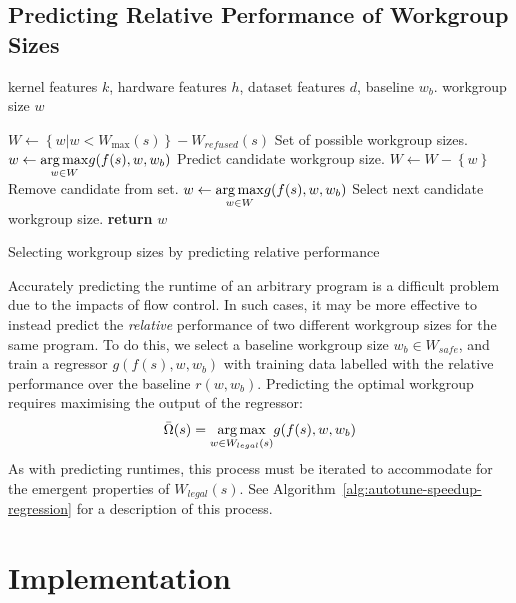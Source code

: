 \subsection{Predicting Relative Performance of Workgroup Sizes}\label{subsec:omnitune-ml-speedup}

\begin{algorithm}
\begin{algorithmic}[1]
\Require kernel features $k$, hardware features $h$, dataset features
$d$, baseline $w_b$.
\Ensure workgroup size $w$

\State $W \leftarrow \left\{ w | w < W_{\max}(s) \right\} - W_{refused}(s)$
\Comment Set of possible workgroup sizes.
\State $w \leftarrow \underset{w \in W}{\operatorname*{arg\,max}} g(f(s), w,w_b)$
\Comment Predict candidate workgroup size.
  \State $W \leftarrow W - \left\{ w \right\}$
  \Comment Remove candidate from set.
  \State $w \leftarrow \underset{w \in W}{\operatorname*{arg\,max}} g(f(s), w,w_b)$
  \Comment Select next candidate workgroup size.
\EndWhile
\State \textbf{return} $w$
\end{algorithmic}
\caption{Selecting workgroup sizes by predicting relative performance}
\label{alg:autotune-speedup-regression}
\end{algorithm}

Accurately predicting the runtime of an arbitrary program is a
difficult problem due to the impacts of flow control. In such cases,
it may be more effective to instead predict the \emph{relative}
performance of two different workgroup sizes for the same program. To
do this, we select a baseline workgroup size $w_b \in W_{safe}$, and
train a regressor $g(f(s),w,w_b)$ with training data labelled with the
relative performance over the baseline $r(w, w_b)$. Predicting the
optimal workgroup requires maximising the output of the regressor:
%
\begin{equation}
  \bar{\Omega}(s) = \underset{w \in W_{legal}(s)}{\operatorname*{arg\,max}} g(f(s),w,w_b)
\end{equation}
%
As with predicting runtimes, this process must be iterated to
accommodate for the emergent properties of $W_{legal}(s)$. See
Algorithm~\ref{alg:autotune-speedup-regression} for a description of
this process.


\section{Implementation}


